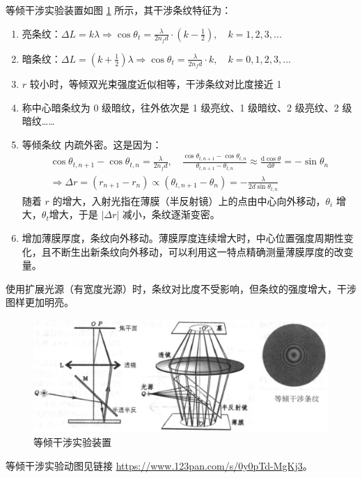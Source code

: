 \documentclass[UTF8]{report}
\theoremstyle{MyLineTheoremStyle} %
\theoremstyle{MyBlockTheoremStyle} %
\theoremstyle{MySubsubsectionStyle} %
\begin{document}
\noindent 等倾干涉实验装置如图 \ref{等倾干涉实验装置} 所示，其干涉条纹特征为：
\begin{enumerate}
\item 亮条纹：$\Delta L = k \lambda \Longrightarrow \cos \theta_t = \frac{\lambda}{2 n_f d} \cdot (k - \frac{1}{2}),\quad k = 1, 2, 3, ... $
\item 暗条纹：$\Delta L = (k + \frac{1}{2}) \lambda \Longrightarrow \cos \theta_t = \frac{\lambda}{2 n_f d} \cdot k,\quad k = 0, 1, 2, 3, ... $
\item $r$ 较小时，等倾双光束强度近似相等，干涉条纹对比度接近 1
\item 称中心暗条纹为 0 级暗纹，往外依次是 1 级亮纹、1 级暗纹、2 级亮纹、2 级暗纹…… 
\item 等倾条纹{\color{red} 内疏外密}。这是因为：
\begin{gather}
\cos \theta_{t, n + 1} - \cos \theta_{t, n} = \frac{\lambda}{2 n_f d},\quad \frac{\cos \theta_{t, n + 1} - \cos \theta_{t, n} }{\theta_{t, n + 1} - \theta_{t, n}}\approx \frac{\mathrm{d} \cos \theta }{\mathrm{d} \theta } = - \sin \theta_n \\ 
\Longrightarrow \Delta r = (r_{n +1} - r_n) \propto (\theta_{t, n+1} - \theta_n) = - \frac{\lambda}{2d \sin \theta_{t, n}}
\end{gather}
随着 $r$ 的增大，入射光指在薄膜（半反射镜）上的点由中心向外移动，$\theta_i$ 增大，$\theta_t$增大，于是 $| \Delta r |$ 减小，条纹逐渐变密。
\item 增加薄膜厚度，条纹向外移动。薄膜厚度连续增大时，中心位置强度周期性变化，且不断生出新条纹向外移动，可以利用这一特点精确测量薄膜厚度的改变量。
\end{enumerate}

使用扩展光源（有宽度光源）时，条纹对比度不受影响，但条纹的强度增大，干涉图样更加明亮。

\begin{figure}[H]\centering
\includegraphics[width=0.7\columnwidth]{assets/3/等倾干涉.jpg}
\caption{ 等倾干涉实验装置}\label{等倾干涉实验装置}
\end{figure}

等倾干涉实验动图见链接 \href{https://www.123pan.com/s/0y0pTd-MgKj3}{https://www.123pan.com/s/0y0pTd-MgKj3}。
\end{document}
